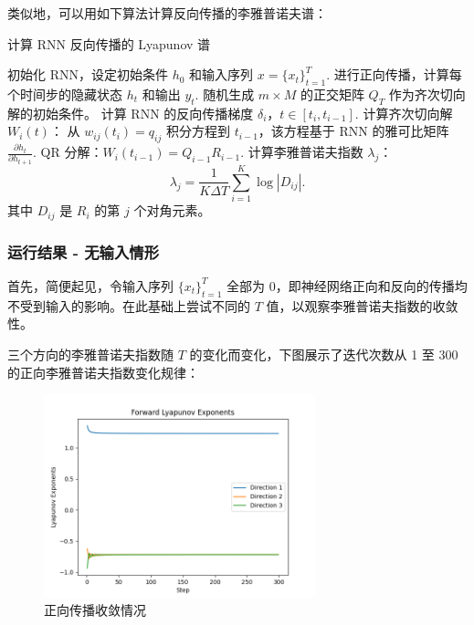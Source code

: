 类似地，可以用如下算法计算反向传播的李雅普诺夫谱：

\begin{algorithm}[H]
  \caption{计算 RNN 反向传播的 Lyapunov 谱}
  \begin{algorithmic}[1]
  \STATE 初始化 RNN，设定初始条件 $h_0$ 和输入序列 $x = \{x_t\}_{t=1}^T$.
  \STATE 进行正向传播，计算每个时间步的隐藏状态 $h_t$ 和输出 $y_t$.
  \STATE 随机生成 $m \times M$ 的正交矩阵 $Q_T$ 作为齐次切向解的初始条件。
      \STATE 计算 RNN 的反向传播梯度 $\delta_i$，$t \in [t_i, t_{i-1}]$.
      \STATE 计算齐次切向解 $W_i(t)$：
          \STATE 从 $w_{ij}(t_i) = q_{ij}$ 积分方程到 $t_{i-1}$，该方程基于 RNN 的雅可比矩阵 $\frac{\partial h_{t}}{\partial h_{t+1}}$.
      \ENDFOR
      \STATE QR 分解：$W_i(t_{i-1}) = Q_{i-1} R_{i-1}$.
  \ENDFOR
  \STATE 计算李雅普诺夫指数 $\lambda_j$：
  \begin{equation}
    \lambda_j = \frac{1}{K \Delta T} \sum_{i=1}^K \log |D_{ij}|.
  \end{equation}
  其中 $D_{ij}$ 是 $R_i$ 的第 $j$ 个对角元素。
  \end{algorithmic}
\end{algorithm}

\clearpage

\subsubsection{运行结果 - 无输入情形}

首先，简便起见，令输入序列 $\{x_t\}_{t=1}^T$ 全部为 0，即神经网络正向和反向的传播均不受到输入的影响。在此基础上尝试不同的 $T$ 值，以观察李雅普诺夫指数的收敛性。

三个方向的李雅普诺夫指数随 $T$ 的变化而变化，下图展示了迭代次数从 1 至 300 的正向李雅普诺夫指数变化规律：

\begin{figure}[htbp]
  \centering
  \includegraphics[width=0.7\textwidth]{figures/lyapunov_exponents_forward.png}
  \caption{正向传播收敛情况}
  \label{fig:example}
\end{figure}

